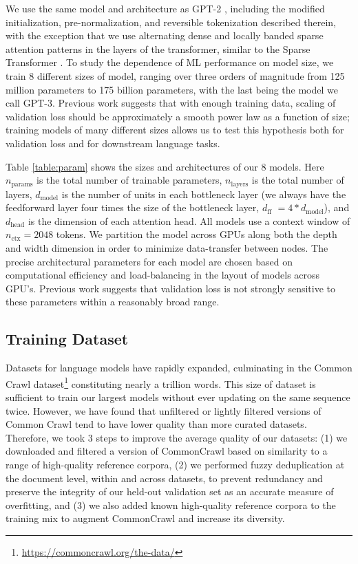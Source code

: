 We use the same model and architecture as GPT-2 \cite{radford2019language}, including the modified initialization, pre-normalization, and reversible tokenization described therein, with the exception that we use alternating dense and locally banded sparse attention patterns in the layers of the transformer, similar to the Sparse Transformer \cite{child2019generating}. To study the dependence of ML performance on model size, we train 8 different sizes of model, ranging over three orders of magnitude from 125 million parameters to 175 billion parameters, with the last being the model we call GPT-3.  Previous work \cite{kaplan2020scaling} suggests that with enough training data, scaling of validation loss should be approximately a smooth power law as a function of size; training models of many different sizes allows us to test this hypothesis both for validation loss and for downstream language tasks.

Table \ref{table:param} shows the sizes and architectures of our 8 models.  Here $n_{\mathrm{params}}$ is the total number of trainable parameters, $n_{\mathrm{layers}}$ is the total number of layers, $d_{\mathrm{model}}$ is the number of units in each bottleneck layer (we always have the feedforward layer four times the size of the bottleneck layer, $d_{\mathrm{ff}}$ $= 4 \ast d_{\mathrm{model}}$), and $d_{\mathrm{head}}$ is the dimension of each attention head.  All models use a context window of $n_{\mathrm{ctx}}=2048$ tokens.  We partition the model across GPUs along both the depth and width dimension in order to minimize data-transfer between nodes. The precise architectural parameters for each model are chosen based on computational efficiency and load-balancing in the layout of models across GPU’s.  Previous work \cite{kaplan2020scaling} suggests that validation loss is not strongly sensitive to these parameters within a reasonably broad range.

    \subsection{Training Dataset}
    \label{section:Training Dataset}

Datasets for language models have rapidly expanded, culminating in the Common Crawl dataset\footnote{\url{https://commoncrawl.org/the-data/}} \cite{raffel2019t5} constituting nearly a trillion words.  This size of dataset is sufficient to train our largest models without ever updating on the same sequence twice. However, we have found that unfiltered or lightly filtered versions of Common Crawl tend to have lower quality than more curated datasets.  Therefore, we took 3 steps to improve the average quality of our datasets: (1) we downloaded and filtered a version of CommonCrawl based on similarity to a range of high-quality reference corpora, (2) we performed fuzzy deduplication at the document level, within and across datasets, to prevent redundancy and preserve the integrity of our held-out validation set as an accurate measure of overfitting, and (3) we also added known high-quality reference corpora to the training mix to augment CommonCrawl and increase its diversity.

